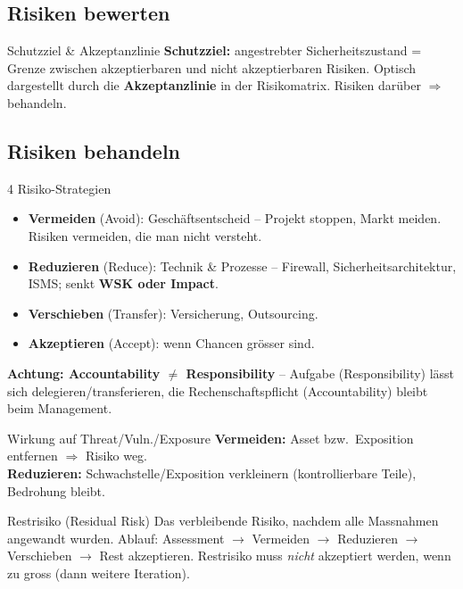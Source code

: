 \documentclass[a4paper, fontsize=7pt]{scrartcl}
\begin{document}
\subsection{Risiken bewerten}

\begin{mainbox}{Schutzziel \& Akzeptanzlinie}
\textbf{Schutzziel:} angestrebter Sicherheitszustand = Grenze zwischen
akzeptierbaren und nicht akzeptierbaren Risiken.
Optisch dargestellt durch die \textbf{Akzeptanzlinie} in der Risikomatrix.
Risiken darüber $\Rightarrow$ behandeln.
\end{mainbox}

\subsection{Risiken behandeln}

\begin{mainbox}{4 Risiko-Strategien}
\begin{itemize}
    \item \textbf{Vermeiden} (Avoid): Geschäftsentscheid -- Projekt stoppen,
          Markt meiden. Risiken vermeiden, die man nicht versteht.
    \item \textbf{Reduzieren} (Reduce): Technik \& Prozesse -- Firewall,
          Sicherheitsarchitektur, ISMS; senkt \textbf{WSK oder Impact}.
    \item \textbf{Verschieben} (Transfer): Versicherung, Outsourcing.
    \item \textbf{Akzeptieren} (Accept): wenn Chancen grösser sind.
\end{itemize}
\textbf{Achtung: Accountability $\neq$ Responsibility} -- Aufgabe
(Responsibility) lässt sich delegieren/transferieren, die
Rechenschaftspflicht (Accountability) bleibt beim Management.
\end{mainbox}

\begin{mainbox}{Wirkung auf Threat/Vuln./Exposure}
\textbf{Vermeiden:} Asset bzw.\ Exposition entfernen $\Rightarrow$ Risiko
weg.\\
\textbf{Reduzieren:} Schwachstelle/Exposition verkleinern (kontrollierbare
Teile), Bedrohung bleibt.
\end{mainbox}

\begin{mainbox}{Restrisiko (Residual Risk)}
Das verbleibende Risiko, nachdem alle Massnahmen angewandt wurden.
Ablauf: Assessment $\to$ Vermeiden $\to$ Reduzieren $\to$ Verschieben $\to$
Rest akzeptieren. Restrisiko muss \emph{nicht} akzeptiert werden, wenn zu
gross (dann weitere Iteration).
\end{mainbox}
\end{document}
